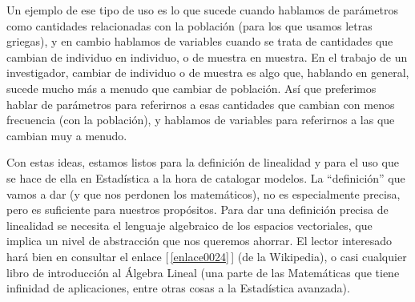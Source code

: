 Un ejemplo de ese tipo de uso es lo que sucede cuando hablamos de parámetros como cantidades relacionadas con la población (para los que usamos letras griegas), y en cambio hablamos de variables cuando se trata de cantidades que cambian de individuo en individuo, o de muestra en muestra. En el trabajo de un investigador, cambiar de individuo o de muestra es algo que, hablando en general, sucede mucho más a menudo que cambiar de población. Así que preferimos hablar de parámetros para referirnos a esas cantidades que cambian con menos frecuencia (con la población), y hablamos de variables para referirnos a las que cambian muy a menudo.

Con estas ideas, estamos listos para la definición de linealidad y para el uso que se hace de ella
en Estadística a la hora de catalogar modelos. La ``definición'' que vamos a dar (y que nos
perdonen los matemáticos), no es especialmente precisa, pero es suficiente  para nuestros
propósitos. Para dar una definición precisa de linealidad se necesita el lenguaje algebraico de los
espacios vectoriales, que implica un nivel de abstracción que nos queremos ahorrar. El lector
interesado hará bien en consultar el enlace [\,\ref{enlace0024}\,]\label{enlace0024a} (de la Wikipedia), o casi cualquier libro de introducción al Álgebra Lineal (una parte de las Matemáticas que tiene infinidad de aplicaciones, entre otras cosas a la Estadística avanzada).


